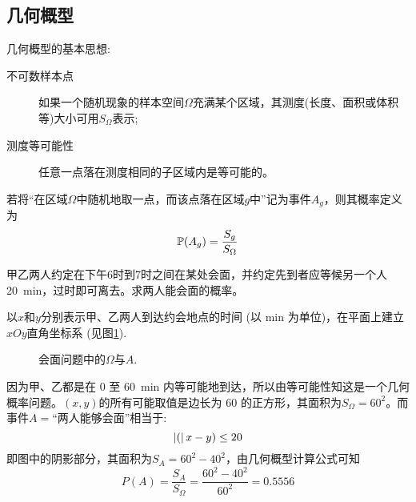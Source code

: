 \subsection{几何概型}

几何概型的基本思想:
\begin{description}
    \item[不可数样本点] 如果一个随机现象的样本空间$\Omega$充满某个区域，其测度(长度、面积或体积等)大小可用$S_\Omega$表示;
    \item[测度等可能性] 任意一点落在测度相同的子区域内是等可能的。
\end{description}

\begin{definition}[几何概型]
    若将“在区域$\Omega$中随机地取一点，而该点落在区域$g$中”记为事件$A_g$，则其概率定义为
    \[ \P(A_g) = \frac{S_g}{S_\Omega}\]
\end{definition}

\begin{example}[会商问题]
    甲乙两人约定在下午6时到7时之间在某处会面，并约定先到者应等候另一个人\SI{20}{\minute}，过时即可离去。求两人能会面的概率。
\end{example}
\begin{solution}
    以$x$和$y$分别表示甲、乙两人到达约会地点的时间 (以 \si{\minute} 为单位)，在平面上建立$xOy$直角坐标系 (见图\ref{fig:meeting_problem}).
    \begin{figure}[!ht]
        \centering
        \caption{会面问题中的$\Omega$与$A$.}
        \label{fig:meeting_problem}
    \end{figure}
    因为甲、乙都是在 0 至 \SI{60}{\minute} 内等可能地到达，所以由等可能性知这是一个几何概率问题。$(x, y)$的所有可能取值是边长为 60 的正方形，其面积为$S_\Omega = 60^2$。而事件$A =$“两人能够会面”相当于:
    \[ \abs(x - y) \le 20 \]
    即图中的阴影部分，其面积为$S_A = 60^2 - 40^2$，由几何概型计算公式可知
    \[ P(A) = \frac{S_A}{S_\Omega} = \frac{60^2 - 40^2}{60^2} = 0.5556 \]
\end{solution}

